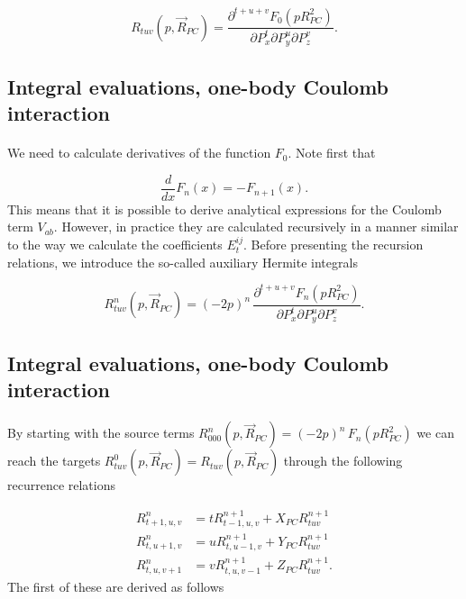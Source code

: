 \documentclass[%
twoside,                 %
final,                   %
10pt]{article}
\begin{document}
\begin{equation}
 R_{tuv}(p,\vec R_{PC}) = \frac{\partial^{t+u+v} F_0(p R^2_{PC})}{\partial P_x^t \partial P_y^u \partial P_z^v}.
\end{equation}




\subsection*{Integral evaluations, one-body Coulomb interaction}

\paragraph{}

We need to calculate derivatives of the function $F_0$. Note first that

\begin{equation}
 \frac{d}{dx}F_n(x) = -F_{n+1}(x).
\end{equation}
This means that it is possible to derive analytical expressions for the Coulomb term $V_{ab}$. However, in practice they are calculated recursively in a manner similar to the way we calculate
the coefficients $E^{ij}_t$. Before presenting the recursion relations, we introduce the so-called auxiliary Hermite integrals

\begin{equation}
 R^n_{tuv}(p,\vec R_{PC}) = (-2p)^n\,\frac{\partial^{t+u+v} F_n(p R^2_{PC})}{\partial P_x^t \partial P_y^u \partial P_z^v}.
\end{equation}



\subsection*{Integral evaluations, one-body Coulomb interaction}

\paragraph{}

By starting with the source terms $R^n_{000}(p,\vec R_{PC}) = (-2p)^n\,F_n(p R^2_{PC})$ we can reach the targets $R^0_{tuv}(p,\vec R_{PC}) = R_{tuv}(p,\vec R_{PC})$ through the following
recurrence relations

\begin{equation}
\label{eq:R_recurrence}
 \begin{split}
  R^n_{t+1,u,v} & = tR^{n+1}_{t-1,u,v} + X_{PC} R^{n+1}_{tuv} \\
  R^n_{t,u+1,v} & = uR^{n+1}_{t,u-1,v} + Y_{PC} R^{n+1}_{tuv} \\
  R^n_{t,u,v+1} & = vR^{n+1}_{t,u,v-1} + Z_{PC} R^{n+1}_{tuv}.
 \end{split}
\end{equation}
The first of these are derived as follows
\end{document}
